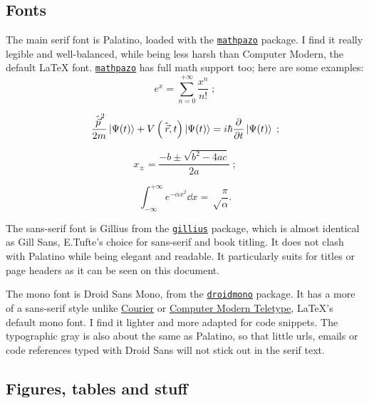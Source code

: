 \documentclass[raggedright, twoside, 11pt]{tufte-style-article}
\begin{document}
\subsection{Fonts}

The main serif font is Palatino, loaded with the \href{www.ctan.org/pkg/mathpazo}{\texttt{mathpazo}} package. I find it really legible and well-balanced, while being less harsh than Computer Modern, the default \LaTeX{} font. \href{www.ctan.org/pkg/mathpazo}{\texttt{mathpazo}} has full math support too; here are some examples:
$$
e^x = \sum_{n=0}^{+\infty} \frac{x^n}{n!} \;; 
$$

$$
\frac{{\hat{\vec p}}^2}{2m}\ket{\Psi(t)} + V\left(\hat{\vec r},t\right)\ket{\Psi(t)} = i\hbar \pdv{}{t}\ket{\Psi(t)} \;;
$$

$$
x_\pm = \frac{-b \pm \sqrt{b^2 - 4ac}}{2a}\;;
$$

$$
\int_{-\infty}^{+\infty} e^{-\alpha x^2} \dd{x} = \sqrt\frac{\pi}{\alpha}.
$$

\begingroup\sffamily
The sans-serif font is Gillius from the \href{www.ctan.org/pkg/gillius}{\texttt{gillius}} package, which is almost identical as Gill Sans, E.Tufte's choice for sans-serif and book titling. It does not clash with Palatino while being elegant and readable. It particularly suits for titles or page headers as it can be seen on this document.
\endgroup

\begingroup\ttfamily
The mono font is Droid Sans Mono, from the \href{www.ctan.org/pkg/droid}{\texttt{droidmono}} package. It has a more of a sans-serif style unlike \href{www.ctan.org/tex-archive/fonts/psfonts/psnfss-source/courier}{Courier} or \href{www.ctan.org/tex-archive/fonts/cm/}{Computer Modern Teletype}, \LaTeX{}'s default mono font. I find it lighter and more adapted for code snippets. The typographic gray is also about the same as Palatino, so that little urls, emails or code references typed with Droid Sans will not stick out in the serif text.
\endgroup

\newpage


\subsection{Figures, tables and stuff}
\end{document}
